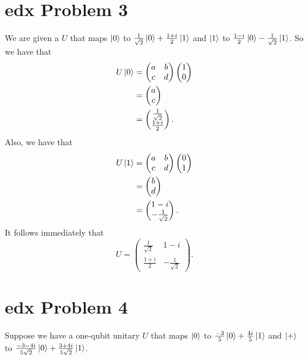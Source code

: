 \documentclass[10pt]{article}
\begin{document}
\section*{edx Problem 3}
We are given a $U$ that maps $\ket{0}$ to $\frac{1}{\sqrt{2}} \ket{0} + \frac{1+i}{2} \ket{1}$ and $\ket{1}$ to $\frac{1 - i}{2} \ket{0} - \frac{1}{\sqrt{2}} \ket{1}$. So we have that
\begin{align*}
U\ket{0} &= 
\begin{pmatrix}
a & b \\
c & d
\end{pmatrix}
\begin{pmatrix}
1 \\
0
\end{pmatrix} \\
&= 
\begin{pmatrix}
a \\
c
\end{pmatrix} \\
&= 
\begin{pmatrix}
\frac{1}{\sqrt{2}} \\
\frac{1 + i}{2}
\end{pmatrix}.
\end{align*}
Also, we have that
\begin{align*}
U\ket{1} &= 
\begin{pmatrix}
a & b \\
c & d
\end{pmatrix}
\begin{pmatrix}
0 \\
1
\end{pmatrix} \\
&= 
\begin{pmatrix}
b \\
d
\end{pmatrix} \\
&= 
\begin{pmatrix}
1-i \\
-\frac{1}{\sqrt{2}}
\end{pmatrix}.
\end{align*}
It follows immediately that
\[
U = 
\begin{pmatrix}
\frac{1}{\sqrt{2}} & 1 - i \\
\frac{1 + i}{2} & -\frac{1}{\sqrt{2}}
\end{pmatrix}.
\]

\section*{edx Problem 4}
Suppose we have a one-qubit unitary $U$ that maps $\ket{0}$ to $\frac{-3}{5} \ket{0} + \frac{4i}{5} \ket{1}$ and $\ket{+}$ to $\frac{-3-4i}{5\sqrt{2}} \ket{0} + \frac{3+4i}{5\sqrt{2}} \ket{1}$.
\end{document}
